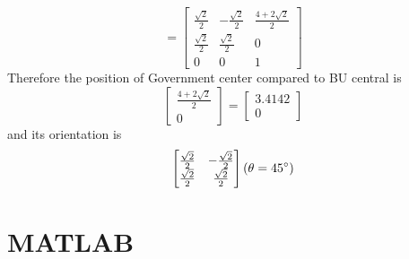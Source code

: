 \documentclass{article}
\begin{document}
\[
	=
	\begin{bmatrix}
		\frac{\sqrt{2}}{2} & -\frac{\sqrt{2}}{2} & \frac{4+2\sqrt{2}}{2} \\
		\frac{\sqrt{2}}{2} & \frac{\sqrt{2}}{2}  & 0                     \\
		0                  & 0                   & 1
	\end{bmatrix}
\]
Therefore the position of Government center compared to BU central is
$$
	\begin{bmatrix}
		\frac{4+2\sqrt{2}}{2} \\
		0
	\end{bmatrix}
	=
	\begin{bmatrix}
		3.4142 \\
		0
	\end{bmatrix}
$$
and its orientation is
$$
	\begin{bmatrix}
		\frac{\sqrt{2}}{2} & -\frac{\sqrt{2}}{2} \\
		\frac{\sqrt{2}}{2} & \frac{\sqrt{2}}{2}
	\end{bmatrix}
	\space
	(\theta = 45^\circ)
$$

\section{MATLAB}

\sloppy
\setlength{\parindent}{0pt}
\end{document}
